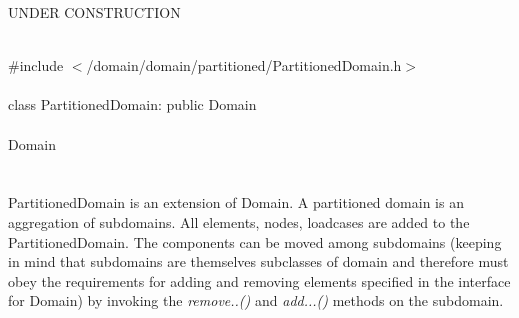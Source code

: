 
UNDER CONSTRUCTION

   \\
\indent \#include $<$/domain/domain/partitioned/PartitionedDomain.h$>$  \\

  \\
\indent class PartitionedDomain: public Domain  \\

 \\
\indent  Domain \\
\indent{} \\


  \\
\indent PartitionedDomain is an extension of Domain. A partitioned
domain is an aggregation of subdomains. All elements, nodes, loadcases
are added to the PartitionedDomain. The components can be moved among 
subdomains (keeping in mind that subdomains are themselves subclasses
of domain and therefore must obey the requirements for adding and
removing elements specified in the interface for Domain) by invoking
the {\em remove..()} and {\em add...()} methods on the subdomain. \\


